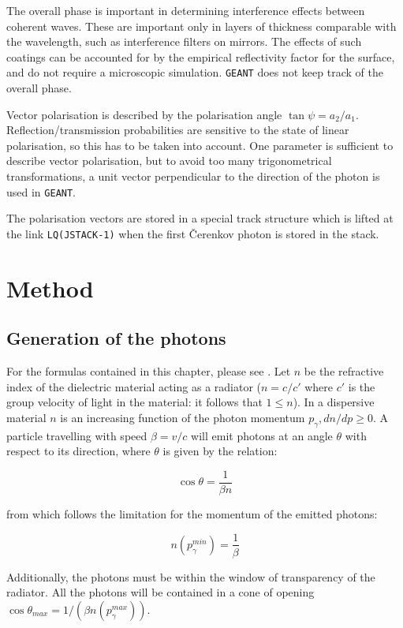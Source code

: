 The overall phase is important in determining interference effects between
coherent waves. These are important only in layers of thickness comparable
with the wavelength, such as interference filters on mirrors. The effects
of such coatings can be accounted for by the empirical reflectivity factor
for the surface, and do not require a microscopic simulation.
{\tt GEANT} does not keep track of the overall phase.

Vector polarisation is described by the polarisation angle
$\tan \psi = a_{2}/a_{1}$.
Reflection/transmission probabilities are sensitive to the state of linear
polarisation, so this has to be taken into account. One parameter is
sufficient to describe vector polarisation, but to avoid too many
trigonometrical transformations, a unit vector perpendicular to the direction
of the photon is used in {\tt GEANT}.

The polarisation vectors are stored in a special track structure which
is lifted at the link {\tt LQ(JSTACK-1)} when the first \v{C}erenkov
photon is stored in the stack.

\section{Method}

\subsection{Generation of the photons}

For the formulas contained in this chapter, please see \cite{bib-JACK}.
Let $n$ be the refractive index of the dielectric material
acting as a radiator
($n=c/c'$ where $c'$ is the group velocity of light in
the material: it follows that $1 \leq n$). In a dispersive material $n$ is
an increasing function of the photon momentum $p_{\gamma},
dn/dp \geq 0$.  A particle travelling
with speed $\beta = v/c$ will emit photons at an angle  $\theta$
with respect to its direction, where $\theta$ is given by the
relation:

\[
\cos \theta = \frac{1}{\beta n}
\]

from which follows the limitation for the momentum of the
emitted photons:

\[
n(p_{\gamma}^{min}) = \frac{1}{\beta}
\]

Additionally, the photons must be within the window of transparency of
the radiator. All the photons will be contained in a cone of opening
$\cos \theta_{max}  = 1/(\beta n(p_{\gamma}^{max}))$.

